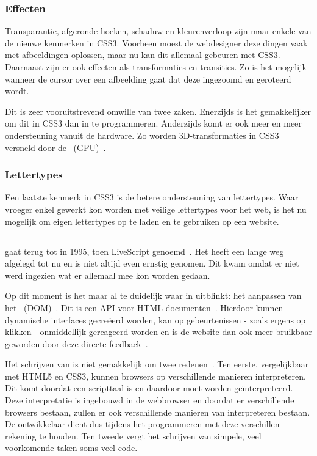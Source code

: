 \subsubsection{Effecten}
Transparantie, afgeronde hoeken, schaduw en kleurenverloop zijn maar enkele van de nieuwe kenmerken in CSS3. 
Voorheen moest de webdesigner deze dingen vaak met afbeeldingen oplossen, maar nu kan dit allemaal gebeuren met CSS3. 
Daarnaast zijn er ook effecten als transformaties en transities. 
Zo is het mogelijk wanneer de cursor over een afbeelding gaat dat deze ingezoomd en geroteerd wordt. 

Dit is zeer vooruitstrevend omwille van twee zaken. 
Enerzijds is het gemakkelijker om dit in CSS3 dan in \js{} te programmeren. 
Anderzijds komt er ook meer en meer ondersteuning vanuit de hardware. 
Zo worden 3D-transformaties in CSS3 versneld door de ~(GPU)~\cite{Hales2012,Kool2012}.

\subsubsection{Lettertypes}
Een laatste kenmerk in CSS3 is de betere ondersteuning van lettertypes. 
Waar vroeger enkel gewerkt kon worden met veilige lettertypes voor het web, is het nu mogelijk om eigen lettertypes op te laden en te gebruiken op een website.

\subsection{\js}
\label{ref:javascript}
\js{} gaat terug tot in 1995, toen LiveScript genoemd~\cite{McFarland2011}. 
Het heeft een lange weg afgelegd tot nu en is niet altijd even ernstig genomen. 
Dit kwam omdat er niet werd ingezien wat er allemaal mee kon worden gedaan. 

Op dit moment is het maar al te duidelijk waar \js{} in uitblinkt: het aanpassen van het ~(DOM)~\cite{PhilDutson2012}. 
Dit is een API voor HTML-documenten~\cite{Hegaret2004}. 
Hierdoor kunnen dynamische interfaces gecreëerd worden, kan op gebeurtenissen - zoals ergens op klikken - onmiddellijk gereageerd worden en is de website dan ook meer bruikbaar geworden door deze directe feedback~\cite{McFarland2011}.

Het schrijven van \js{} is niet gemakkelijk om twee redenen~\cite{McFarland2011}. 
Ten eerste, vergelijkbaar met HTML5 en CSS3, kunnen browsers \js{} op verschillende manieren interpreteren. 
Dit komt doordat \js{} een scripttaal is en daardoor moet worden geïnterpreteerd.
Deze interpretatie is ingebouwd in de webbrowser en doordat er verschillende browsers bestaan, zullen er ook verschillende manieren van interpreteren bestaan.
De ontwikkelaar dient dus tijdens het programmeren met deze verschillen rekening te houden. 
Ten tweede vergt het schrijven van simpele, veel voorkomende taken soms veel code.


